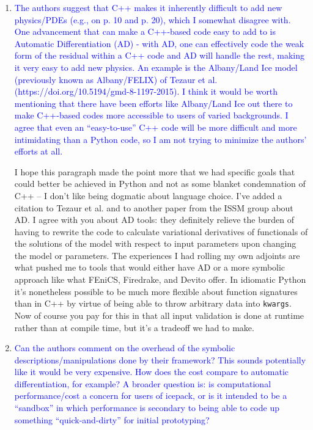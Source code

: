 \documentclass{article}
\theoremstyle{definition}
\theoremstyle{plain}
\begin{document}
\begin{enumerate}
\item \textcolor{blue}{The authors suggest that C++ makes it inherently difficult to add new physics/PDEs (e.g., on p. 10
and p. 20), which I somewhat disagree with. One advancement that can make a C++-based code
easy to add to is Automatic Differentiation (AD) - with AD, one can effectively code the weak form
of the residual within a C++ code and AD will handle the rest, making it very easy to add new
physics. An example is the Albany/Land Ice model (previously known as Albany/FELIX) of Tezaur
et al. (https://doi.org/10.5194/gmd-8-1197-2015). I think it would be worth mentioning that
there have been efforts like Albany/Land Ice out there to make C++-based codes more accessible to
users of varied backgrounds. I agree that even an “easy-to-use” C++ code will be more difficult and
more intimidating than a Python code, so I am not trying to minimize the authors’ efforts at all.}

I hope this paragraph made the point more that we had specific goals that could better be achieved in Python and not as some blanket condemnation of C++ -- I don't like being dogmatic about language choice.
I've added a citation to Tezaur et al. and to another paper from the ISSM group about AD.
I agree with you about AD tools: they definitely relieve the burden of having to rewrite the code to calculate variational derivatives of functionals of the solutions of the model with respect to input parameters upon changing the model or parameters.
The experiences I had rolling my own adjoints are what pushed me to tools that would either have AD or a more symbolic approach like what FEniCS, Firedrake, and Devito offer.
In idiomatic Python it's nonetheless possible to be much more flexible about function signatures than in C++ by virtue of being able to throw arbitrary data into \texttt{kwargs}.
Now of course you pay for this in that all input validation is done at runtime rather than at compile time, but it's a tradeoff we had to make.

\item \textcolor{blue}{Can the authors comment on the overhead of the symbolic descriptions/manipulations done by their
framework? This sounds potentially like it would be very expensive. How does the cost compare to
automatic differentiation, for example? A broader question is: is computational performance/cost a
concern for users of icepack, or is it intended to be a “sandbox” in which performance is secondary
to being able to code up something “quick-and-dirty” for initial prototyping?}


\end{enumerate}
\end{document}
